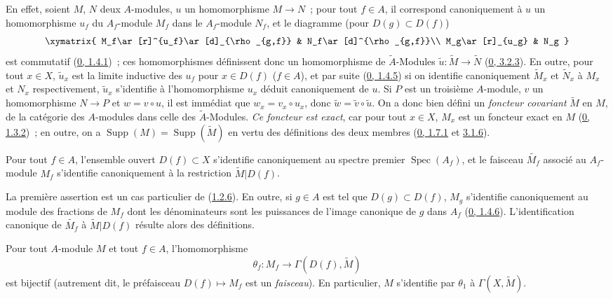 En effet, soient $M$, $N$ deux $A$-modules, $u$ un homomorphisme
$M\to N$~; pour tout $f\in A$, il correspond canoniquement à $u$ un
homomorphisme $u_f$ du $A_f$-module $M_f$ dans le $A_f$-module $N_f$, et le
diagramme (pour $D(g)\subset D(f)$)
\[
  \xymatrix{
    M_f\ar[r]^{u_f}\ar[d]_{\rho_{g,f}} & N_f\ar[d]^{\rho_{g,f}}\\
    M_g\ar[r]_{u_g} & N_g
  }
\]
est commutatif (\hyperref[0.1.4.1-fr]{0, 1.4.1})~; ces homomorphismes
définissent donc un homomorphisme de $\widetilde{A}$-Modules
$\widetilde{u}:\widetilde{M}\to\widetilde{N}$
(\hyperref[0.3.2.3-fr]{0, 3.2.3}). En outre, pour tout $x\in X$,
$\widetilde{u}_x$ est la limite inductive des $u_f$ pour $x\in D(f)$
($f\in A$), et par suite (\hyperref[0.1.4.5-fr]{0, 1.4.5}) si on identifie
canoniquement $\widetilde{M}_x$ et $\widetilde{N}_x$ à $M_x$ et $N_x$
respectivement, $\widetilde{u}_x$ s'identifie à l'homomorphisme $u_x$ déduit
canoniquement de $u$. Si $P$ est un troisième $A$-module, $v$ un
homomorphisme $N\to P$ et $w=v\circ u$, il est immédiat que
$w_x=v_x\circ u_x$, donc $\widetilde{w}=\widetilde{v}\circ\widetilde{u}$. On
a donc bien défini un \emph{foncteur covariant} $\widetilde{M}$ en $M$, de la
catégorie des $A$-modules dans celle des $\widetilde{A}$-Modules. \emph{Ce
foncteur est exact}, car pour tout $x\in X$, $M_x$ est un foncteur exact en
$M$ (\hyperref[0.1.3.2-fr]{0, 1.3.2})~; en outre, on a
$\operatorname{Supp}(M)=\operatorname{Supp}(\widetilde{M})$ en vertu des
définitions des deux membres (\hyperref[0.1.7.1-fr]{0, 1.7.1} et
\hyperref[0.3.1.6-fr]{3.1.6}).

\begin{proposition}[1.3.6]
\label{I.1.3.6-fr}
Pour tout $f\in A$, l'ensemble ouvert $D(f)\subset X$ s'identifie
canoniquement au spectre premier $\operatorname{Spec}(A_f)$, et le faisceau
$\widetilde{M_f}$ associé au $A_f$-module $M_f$ s'identifie canoniquement à
la restriction $\widetilde{M}|D(f)$.
\end{proposition}

La première assertion est un cas particulier de
(\hyperref[I.1.2.6-fr]{1.2.6}). En outre, si $g\in A$ est tel que
$D(g)\subset D(f)$, $M_g$ s'identifie canoniquement au module des fractions
de $M_f$ dont les dénominateurs sont les puissances de l'image canonique de
$g$ dans $A_f$ (\hyperref[0.1.4.6-fr]{0, 1.4.6}). L'identification canonique
de $\widetilde{M_f}$ à $\widetilde{M}|D(f)$ résulte alors des définitions.

\begin{theorem}[1.3.7]
\label{I.1.3.7-fr}
Pour tout $A$-module $M$ et tout $f\in A$, l'homomorphisme
\[
  \theta_f:M_f\longrightarrow\Gamma(D(f),\widetilde{M})
\]
est bijectif (autrement dit, le préfaisceau $D(f)\mapsto M_f$ est un
\emph{faisceau}). En particulier, $M$ s'identifie par $\theta_1$ à
$\Gamma(X,\widetilde{M})$.
\end{theorem}


